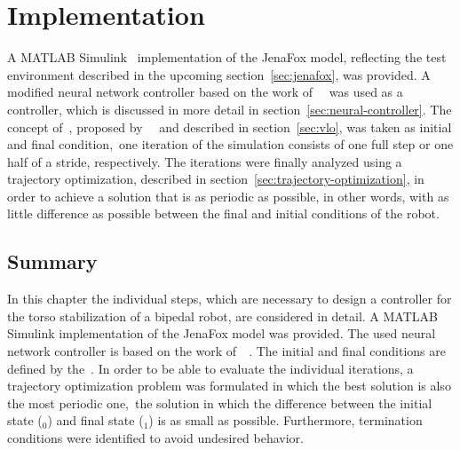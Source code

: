 \chapter{Implementation}%
\label{sec:implementation}

A MATLAB\textsuperscript{\textregistered} Simulink~\cite{MATLAB:2022} implementation of the JenaFox model, reflecting the test environment described in the upcoming section~\ref{sec:jenafox}, was provided. A modified neural network controller based on the work of~\citeauthor{Geng2006}~\cite{Geng2006} was used as a controller, which is discussed in more detail in section~\ref{sec:neural-controller}. The concept of~, proposed by~\citeauthor*{Rummel2010}~\cite{Rummel2010} and described in section~\ref{sec:vlo}, was taken as initial and final condition,~\ie one iteration of the simulation consists of one full step or one half of a stride, respectively. The iterations were finally analyzed using a trajectory optimization, described in section~\ref{sec:trajectory-optimization}, in order to achieve a solution that is as periodic as possible, in other words, with as little difference as possible between the final and initial conditions of the robot.

%
%
%
%

\section{Summary}

In this chapter the individual steps, which are necessary to design a controller for the torso stabilization of a bipedal robot, are considered in detail. A MATLAB\textsuperscript{\textregistered} Simulink implementation of the JenaFox model was provided. The used neural network controller is based on the work of~\citeauthor{Geng2006}~\cite{Geng2006}. The initial and final conditions are defined by the~. In order to be able to evaluate the individual iterations, a trajectory optimization problem was formulated in which the best solution is also the most periodic one,~\ie the solution in which the difference between the initial state ($_0$) and final state ($_1$) is as small as possible. Furthermore, termination conditions were identified to avoid undesired behavior.

